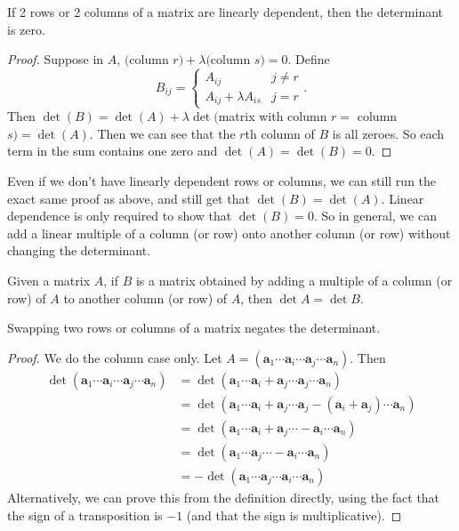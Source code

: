 \documentclass[a4paper]{article}
\begin{document}
\begin{prop}
  If 2 rows or 2 columns of a matrix are linearly dependent, then the determinant is zero.
\end{prop}

\begin{proof}
  Suppose in $A$, $($column $r) + \lambda($column $s) = 0$. Define
  \[
    B_{ij} =
    \begin{cases}
      A_{ij} & j\not= r\\
      A_{ij} + \lambda A_{is} & j = r
    \end{cases}.
  \]
  Then $\det (B) = \det(A) + \lambda \det($matrix with column $r =$ column $s) = \det(A)$. Then we can see that the $r$th column of $B$ is all zeroes. So each term in the sum contains one zero and $\det (A) = \det (B) = 0$.
\end{proof}
Even if we don't have linearly dependent rows or columns, we can still run the exact same proof as above, and still get that $\det (B) = \det (A)$. Linear dependence is only required to show that $\det (B) = 0$. So in general, we can add a linear multiple of a column (or row) onto another column (or row) without changing the determinant.

\begin{prop}
  Given a matrix $A$, if $B$ is a matrix obtained by adding a multiple of a column (or row) of $A$ to another column (or row) of $A$, then $\det A = \det B$.
\end{prop}

\begin{cor}
  Swapping two rows or columns of a matrix negates the determinant.
\end{cor}

\begin{proof}
  We do the column case only. Let $A = (\mathbf{a}_1 \cdots \mathbf{a}_i \cdots \mathbf{a}_j \cdots \mathbf{a}_n)$. Then
  \begin{align*}
    \det (\mathbf{a}_1 \cdots \mathbf{a}_i \cdots \mathbf{a}_j \cdots \mathbf{a}_n)&=\det(\mathbf{a}_1 \cdots \mathbf{a}_i + \mathbf{a}_j \cdots \mathbf{a}_j \cdots \mathbf{a}_n)\\
    &=\det (\mathbf{a}_1 \cdots \mathbf{a}_i + \mathbf{a}_j \cdots \mathbf{a}_j - (\mathbf{a}_i + \mathbf{a}_j) \cdots \mathbf{a}_n)\\
    &=\det (\mathbf{a}_1 \cdots \mathbf{a}_i + \mathbf{a}_j \cdots -\mathbf{a}_i \cdots \mathbf{a}_n)\\
    &=\det (\mathbf{a}_1 \cdots \mathbf{a}_j \cdots -\mathbf{a}_i \cdots \mathbf{a}_n)\\
    &=-\det (\mathbf{a}_1 \cdots \mathbf{a}_j \cdots \mathbf{a}_i \cdots \mathbf{a}_n)
  \end{align*}
  Alternatively, we can prove this from the definition directly, using the fact that the sign of a transposition is $-1$ (and that the sign is multiplicative).
\end{proof}
\end{document}
